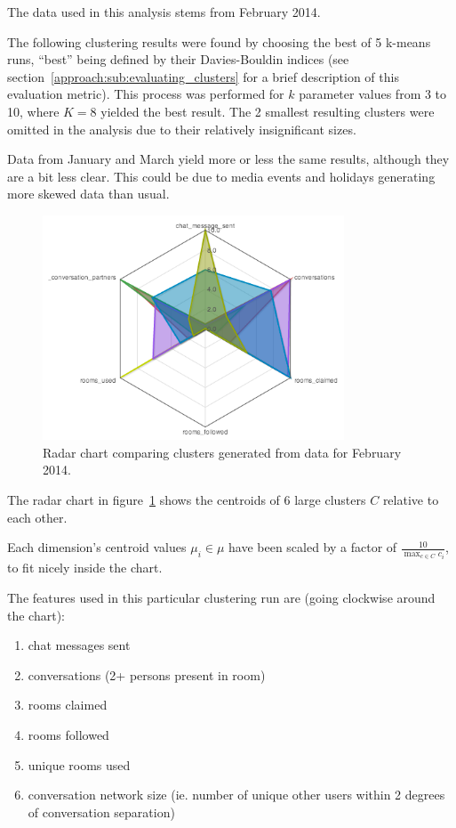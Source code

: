 The data used in this analysis stems from February 2014.

The following clustering results were found by choosing the best of 5 k-means runs, ``best'' being defined by their Davies-Bouldin indices (see section~\ref{approach:sub:evaluating_clusters} for a brief description of this evaluation metric). This process was performed for $k$ parameter values from 3 to 10, where $K = 8$ yielded the best result. The 2 smallest resulting clusters were omitted in the analysis due to their relatively insignificant sizes.

Data from January and March yield more or less the same results, although they are a bit less clear. This could be due to media events and holidays generating more skewed data than usual.

\begin{figure}[h]
  \centering
    \includegraphics[width=0.8\textwidth]{Figures/clusterings/confluence-post/comp-02-feb}
    \caption{Radar chart comparing clusters generated from data for February 2014.}
    \label{fig:radar-clusters-february}
\end{figure}

The radar chart in figure~\ref{fig:radar-clusters-february} shows the centroids of 6 large clusters $C$ relative to each other.

Each dimension's centroid values $\mu_i \in \mu$ have been scaled by a factor of $\frac{10}{\max_{c \in C}{c_i}}$, to fit nicely inside the chart.

The features used in this particular clustering run are (going clockwise around the chart):

\begin{enumerate}
  \item chat messages sent
  \item conversations (2+ persons present in room)
  \item rooms claimed
  \item rooms followed
  \item unique rooms used
  \item conversation network size (ie. number of unique other users within 2 degrees of conversation separation)
\end{enumerate}

